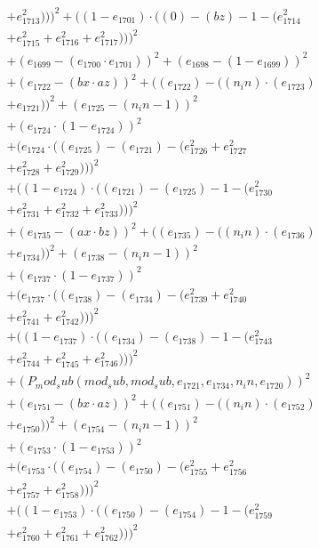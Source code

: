 \documentclass[10pt, a4paper]{article}
\begin{document}
\begin{small}
\begin{align*}
& + e_{1713}^{2})))^{2} + ((1 - e_{1701})  \cdot  ((0) - (bz) - 1 - (e_{1714}^{2} \\
& + e_{1715}^{2} + e_{1716}^{2} + e_{1717}^{2})))^{2} \\
& + (e_{1699} - (e_{1700}  \cdot  e_{1701}))^{2} + (e_{1698} - (1 - e_{1699}))^{2} \\
& + (e_{1722} - (bx  \cdot  az))^{2} + ((e_{1722}) - ((n_in)  \cdot  (e_{1723}) \\
& + e_{1721}))^{2} + (e_{1725} - (n_in - 1))^{2} \\
& + (e_{1724}  \cdot  (1 - e_{1724}))^{2} \\
& + (e_{1724}  \cdot  ((e_{1725}) - (e_{1721}) - (e_{1726}^{2} + e_{1727}^{2} \\
& + e_{1728}^{2} + e_{1729}^{2})))^{2} \\
& + ((1 - e_{1724})  \cdot  ((e_{1721}) - (e_{1725}) - 1 - (e_{1730}^{2} \\
& + e_{1731}^{2} + e_{1732}^{2} + e_{1733}^{2})))^{2} \\
& + (e_{1735} - (ax  \cdot  bz))^{2} + ((e_{1735}) - ((n_in)  \cdot  (e_{1736}) \\
& + e_{1734}))^{2} + (e_{1738} - (n_in - 1))^{2} \\
& + (e_{1737}  \cdot  (1 - e_{1737}))^{2} \\
& + (e_{1737}  \cdot  ((e_{1738}) - (e_{1734}) - (e_{1739}^{2} + e_{1740}^{2} \\
& + e_{1741}^{2} + e_{1742}^{2})))^{2} \\
& + ((1 - e_{1737})  \cdot  ((e_{1734}) - (e_{1738}) - 1 - (e_{1743}^{2} \\
& + e_{1744}^{2} + e_{1745}^{2} + e_{1746}^{2})))^{2} \\
& + (P_mod_sub(mod_sub, mod_sub, e_{1721}, e_{1734}, n_in, e_{1720}))^{2} \\
& + (e_{1751} - (bx  \cdot  az))^{2} + ((e_{1751}) - ((n_in)  \cdot  (e_{1752}) \\
& + e_{1750}))^{2} + (e_{1754} - (n_in - 1))^{2} \\
& + (e_{1753}  \cdot  (1 - e_{1753}))^{2} \\
& + (e_{1753}  \cdot  ((e_{1754}) - (e_{1750}) - (e_{1755}^{2} + e_{1756}^{2} \\
& + e_{1757}^{2} + e_{1758}^{2})))^{2} \\
& + ((1 - e_{1753})  \cdot  ((e_{1750}) - (e_{1754}) - 1 - (e_{1759}^{2} \\
& + e_{1760}^{2} + e_{1761}^{2} + e_{1762}^{2})))^{2} \\

\end{align*}
\end{small}
\end{document}
